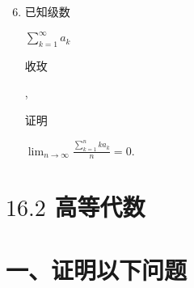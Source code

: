 \documentclass[10pt]{article}
\begin{document}
\begin{enumerate}
  \setcounter{enumi}{5}
  \item \begin{CJK}{UTF8}{mj}已知级数\end{CJK} $\sum_{k=1}^{\infty} a_{k}$ \begin{CJK}{UTF8}{mj}收玫\end{CJK}, \begin{CJK}{UTF8}{mj}证明\end{CJK} $\lim _{n \rightarrow \infty} \frac{\sum_{k=1}^{n} k a_{k}}{n}=0$.
\end{enumerate}
\section{$16.2$ 高等代数}
\section{一、证明以下问题}
\end{document}
